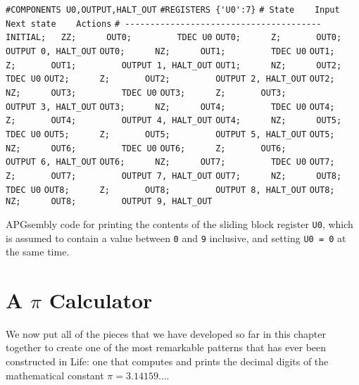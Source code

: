 \begin{apgsembly}
	\begin{algorithmic}\small
		\State \verb|#COMPONENTS U0,OUTPUT,HALT_OUT|
		\State \verb|#REGISTERS {'U0':7}|
		\State \verb|# State    Input    Next state    Actions|
		\State \verb|# ---------------------------------------|
		\State \verb|INITIAL;   ZZ;      OUT0;         TDEC U0|
		\State \verb|OUT0;      Z;       OUT0;         OUTPUT 0, HALT_OUT|
		\State \verb|OUT0;      NZ;      OUT1;         TDEC U0|
		\State \verb|OUT1;      Z;       OUT1;         OUTPUT 1, HALT_OUT|
		\State \verb|OUT1;      NZ;      OUT2;         TDEC U0|
		\State \verb|OUT2;      Z;       OUT2;         OUTPUT 2, HALT_OUT|
		\State \verb|OUT2;      NZ;      OUT3;         TDEC U0|
		\State \verb|OUT3;      Z;       OUT3;         OUTPUT 3, HALT_OUT|
		\State \verb|OUT3;      NZ;      OUT4;         TDEC U0|
		\State \verb|OUT4;      Z;       OUT4;         OUTPUT 4, HALT_OUT|
		\State \verb|OUT4;      NZ;      OUT5;         TDEC U0|
		\State \verb|OUT5;      Z;       OUT5;         OUTPUT 5, HALT_OUT|
		\State \verb|OUT5;      NZ;      OUT6;         TDEC U0|
		\State \verb|OUT6;      Z;       OUT6;         OUTPUT 6, HALT_OUT|
		\State \verb|OUT6;      NZ;      OUT7;         TDEC U0|
		\State \verb|OUT7;      Z;       OUT7;         OUTPUT 7, HALT_OUT|
		\State \verb|OUT7;      NZ;      OUT8;         TDEC U0|
		\State \verb|OUT8;      Z;       OUT8;         OUTPUT 8, HALT_OUT|
		\State \verb|OUT8;      NZ;      OUT8;         OUTPUT 9, HALT_OUT|
	\end{algorithmic}
	\caption{APGsembly code for printing the contents of the sliding block register \texttt{U0}, which is assumed to contain a value between \texttt{0} and \texttt{9} inclusive, and setting \texttt{U0 = 0} at the same time.}\label{alg:apgsembly_print_sbr}
\end{apgsembly}



\section{A \texorpdfstring{$\pi$}{Pi} Calculator}\label{sec:pi_calc}

We now put all of the pieces that we have developed so far in this chapter together to create one of the most remarkable patterns that has ever been constructed in Life: one that computes and prints the decimal digits of the mathematical constant $\pi = 3.14159\ldots$.

